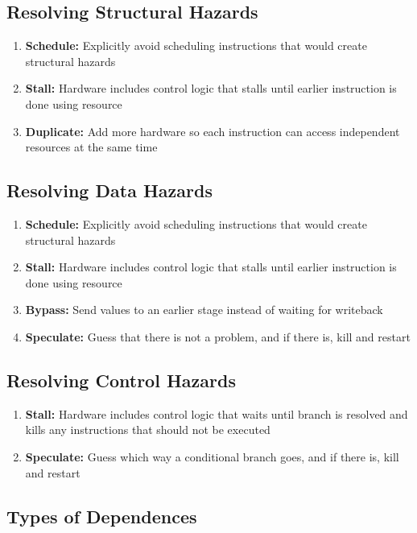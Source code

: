 \documentclass{article}
\begin{document}
\subsection{Resolving Structural Hazards}

\begin{enumerate}
\item \textbf{Schedule:} Explicitly avoid scheduling instructions that would create structural hazards 
\item \textbf{Stall:} Hardware includes control logic that stalls until earlier instruction is done using resource
\item \textbf{Duplicate:} Add more hardware so each instruction can access independent resources at the same time 
\end{enumerate}

\subsection{Resolving Data Hazards}

\begin{enumerate}
\item \textbf{Schedule:} Explicitly avoid scheduling instructions that would create structural hazards 
\item \textbf{Stall:} Hardware includes control logic that stalls until earlier instruction is done using resource
\item \textbf{Bypass:} Send values to an earlier stage instead of waiting for writeback
\item \textbf{Speculate:} Guess that there is not a problem, and if there is, kill and restart
\end{enumerate}

\subsection{Resolving Control Hazards}

\begin{enumerate}
\item \textbf{Stall:} Hardware includes control logic that waits until branch is resolved and kills any instructions that should not be executed
\item \textbf{Speculate:} Guess which way a conditional branch goes, and if there is, kill and restart
\end{enumerate}

\subsection{Types of Dependences}
\end{document}
